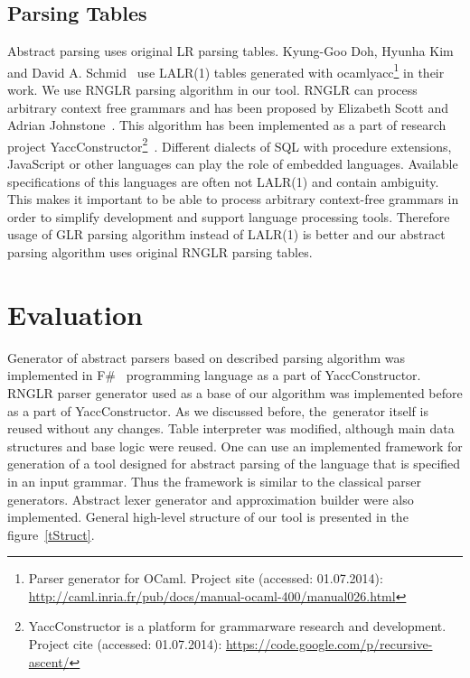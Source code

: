 \documentclass{sigplanconf}
\begin{document}
\subsection{Parsing Tables}

Abstract parsing uses original LR parsing tables. Kyung-Goo Doh, Hyunha Kim and David A. Schmid~\cite{AbstrParsing} use LALR(1) tables generated with ocamlyacc\footnote{Parser generator for OCaml. Project site (accessed: 01.07.2014): \url{http://caml.inria.fr/pub/docs/manual-ocaml-400/manual026.html}} in their work. We use RNGLR parsing algorithm  in our tool. RNGLR can process arbitrary context free grammars and has been proposed by Elizabeth Scott and Adrian Johnstone~\cite{RNGLR}. This algorithm has been implemented as a part of research project  
YaccConstructor\footnote{YaccConstructor is a platform for grammarware research and development. Project cite (accessed: 01.07.2014): \url{https://code.google.com/p/recursive-ascent/}}~\cite{GrigorevKirilenkoYC}. Different dialects of SQL with procedure extensions, JavaScript or other languages can play the role of embedded languages. Available specifications of this languages are often not LALR(1) and contain ambiguity. This makes it important to be able to process arbitrary context-free grammars in order to simplify development and support language processing tools. Therefore usage of GLR parsing algorithm instead of LALR(1) is better and our abstract parsing algorithm uses original RNGLR parsing tables. 



\section{Evaluation}

Generator of abstract parsers based on described parsing algorithm was implemented in F\#~\cite{FS} programming language as a part of YaccConstructor. RNGLR parser generator used as a base of our algorithm was implemented before as a part of YaccConstructor. As we discussed before, the~generator itself is reused without any changes. Table interpreter was modified, although main data structures and base logic were reused. One can use an implemented framework for generation of a tool designed for abstract parsing of the language that is specified in an input grammar. Thus the framework is similar to the classical parser generators. Abstract lexer generator and approximation builder were also implemented. General high-level structure of our tool is presented in the figure~\ref{tStruct}.
\end{document}
